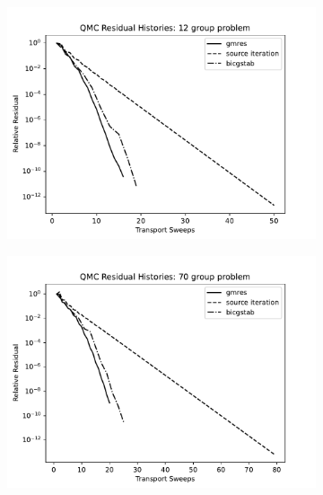 \begin{figure}
     \centering
     \begin{subfigure}[b]{0.45\textwidth}
         \centering
         \includegraphics[width=\textwidth]{FIGURES/12Group.pdf}
         \caption{\label{fig:618group}}
     \end{subfigure}
     \hfill
     \begin{subfigure}[b]{0.45\textwidth}
         \centering
         \includegraphics[width=\textwidth]{FIGURES/70Group.pdf}
         \caption{\label{fig:70group}}
     \end{subfigure}
     \\
     \begin{subfigure}[b]{0.45\textwidth}

\end{subfigure}
\end{figure}

